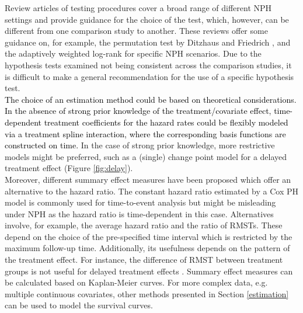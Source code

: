\documentclass{article}
\newcommand{\NEW}[2][black]{\textcolor{#1}{#2}}
\begin{document}
Review articles of testing procedures cover a
broad range of different NPH settings and provide guidance for the choice
of the test, which, however, can be different from one comparison study to
another. 
These reviews offer some guidance on, for example, the permutation test by Ditzhaus and Friedrich \cite{Ditzhaus.2020}, and the adaptively weighted log-rank \cite{Yang.2010} for specific NPH scenarios.
Due to the hypothesis tests examined not being consistent across the comparison studies, it is difficult to make a general recommendation for the use of a specific hypothesis test. 
\\
\noindent
\NEW{The choice of an estimation method could be based on theoretical considerations.
In the absence of strong prior knowledge of the treatment/covariate effect, time-dependent treatment coefficients for the hazard rates could be flexibly modeled via a treatment spline interaction, where the corresponding basis functions are constructed on time.}
In the case of strong prior knowledge, more restrictive models might be preferred, such as a (single) change point model for a delayed treatment effect (Figure \ref{fig:delay}). 
\\
\noindent
Moreover, different summary effect measures have been proposed which offer an alternative to the hazard ratio. The constant hazard ratio estimated by a Cox PH model is commonly used for time-to-event analysis but might be misleading under NPH as the hazard ratio is time-dependent in this case. Alternatives involve, for example, the average hazard ratio and the ratio of RMSTs. These depend on the choice of the pre-specified time interval which is restricted by the maximum follow-up time. Additionally, its usefulness depends on the pattern of the treatment effect. For instance, the difference of RMST between treatment groups is not useful for delayed treatment effects \cite{Gregson.2019}. Summary effect measures can be calculated based on Kaplan-Meier curves. For more complex data, e.g. multiple continuous covariates, other methods presented in Section \ref{estimation} can be used to model the survival curves.
\end{document}
